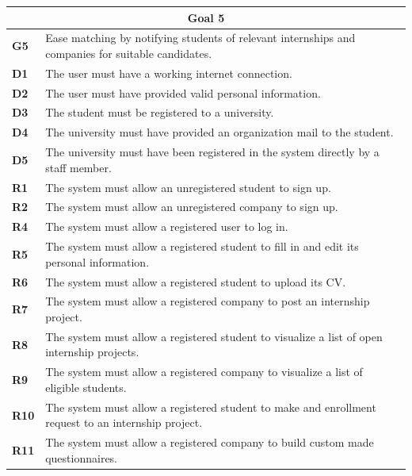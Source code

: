 \begin{table}[H]
    \centering
    \begin{tabular}{|l|m{10cm}|}
        \hline \multicolumn{2}{|c|}{\textbf{Goal 5}} \\
        \hline \textbf{G5} & Ease matching by notifying students of relevant internships and companies for suitable candidates. \\
        \hline \textbf{D1} & The user must have a working internet connection. \\
        \hline \textbf{D2} & The user must have provided valid personal information. \\
        \hline \textbf{D3} & The student must be registered to a university. \\
        \hline \textbf{D4} & The university must have provided an organization mail to the student. \\
        \hline \textbf{D5} & The university must have been registered in the system directly by a staff member. \\
        \hline \textbf{R1} & The system must allow an unregistered student to sign up.\\
        \hline \textbf{R2} & The system must allow an unregistered company to sign up. \\
        \hline \textbf{R4} & The system must allow a registered user to log in. \\
        \hline \textbf{R5} & The system must allow a registered student to fill in and edit its personal information. \\
        \hline \textbf{R6} & The system must allow a registered student to upload its CV. \\
        \hline \textbf{R7} & The system must allow a registered company to post an internship project. \\
        \hline \textbf{R8} & The system must allow a registered student to visualize a list of open internship projects. \\
        \hline \textbf{R9} & The system must allow a registered company to visualize a list of eligible students. \\
        \hline \textbf{R10} & The system must allow a registered student to make and enrollment request to an internship project. \\
        \hline \textbf{R11} & The system must allow a registered company to build custom made questionnaires. \\

\end{tabular}
\end{table}
